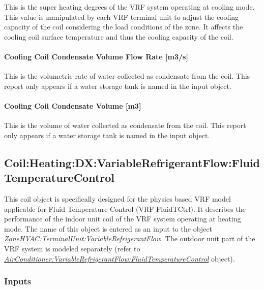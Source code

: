 This is the super heating degrees of the VRF system operating at cooling mode. This value is manipulated by each VRF terminal unit to adjust the cooling capacity of the coil considering the load conditions of the zone. It affects the cooling coil surface temperature and thus the cooling capacity of the coil.

\paragraph{Cooling Coil Condensate Volume Flow Rate {[}m3/s{]}}\label{cooling-coil-condensate-volume-flow-rate-m3s-2}

This is the volumetric rate of water collected as condensate from the coil. This report only appears if a water storage tank is named in the input object.

\paragraph{Cooling Coil Condensate Volume {[}m3{]}}\label{cooling-coil-condensate-volume-m3-2}

This is the volume of water collected as condensate from the coil. This report only appears if a water storage tank is named in the input object.

\subsection{Coil:Heating:DX:VariableRefrigerantFlow:FluidTemperatureControl}\label{coilheatingdxvariablerefrigerantflowfluidtemperaturecontrol}

This coil object is specifically designed for the physics based VRF model applicable for Fluid Temperature Control (VRF-FluidTCtrl). It describes the performance of the indoor unit coil of the VRF system operating at heating mode. The name of this object is entered as an input to the object \emph{\hyperref[zonehvacterminalunitvariablerefrigerantflow]{ZoneHVAC:TerminalUnit:VariableRefrigerantFlow}}. The outdoor unit part of the VRF system is modeled separately (refer to \emph{\hyperref[airconditionervariablerefrigerantflowfluidtemperaturecontrol]{AirConditioner:VariableRefrigerantFlow:FluidTemperatureControl}} object).

\subsubsection{Inputs}\label{inputs-9-007}

